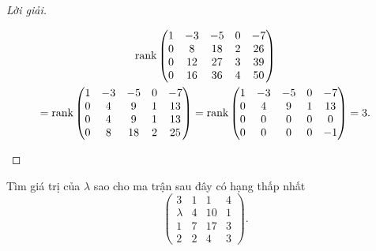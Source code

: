 \documentclass[class=nhvh-linear-algebra,crop=false]{standalone}
\begin{document}
\begin{proof}[Lời giải]
\begin{enumerate}[label = (\alph*)]
\begin{gather*}
                  \text{rank}\begin{pmatrix}
                      1 & -3 & -5 & 0 & -7 \\
                      0 & 8  & 18 & 2 & 26 \\
                      0 & 12 & 27 & 3 & 39 \\
                      0 & 16 & 36 & 4 & 50
                  \end{pmatrix} \\
                  =\text{rank}\begin{pmatrix}
                      1 & -3 & -5 & 0 & -7 \\
                      0 & 4  & 9  & 1 & 13 \\
                      0 & 4  & 9  & 1 & 13 \\
                      0 & 8  & 18 & 2 & 25
                  \end{pmatrix}
                  =\text{rank}\begin{pmatrix}
                      1 & -3 & -5 & 0 & -7 \\
                      0 & 4  & 9  & 1 & 13 \\
                      0 & 0  & 0  & 0 & 0  \\
                      0 & 0  & 0  & 0 & -1
                  \end{pmatrix}
                  = 3.
              \end{gather*}
              \endgroup{}
    \end{enumerate}
\end{proof}

\begin{exercise}
    \par Tìm giá trị của $\lambda$ sao cho ma trận sau đây có hạng thấp nhất
    \[
        \begin{pmatrix}
            3       & 1 & 1  & 4 \\
            \lambda & 4 & 10 & 1 \\
            1       & 7 & 17 & 3 \\
            2       & 2 & 4  & 3
        \end{pmatrix}.
    \]
\end{exercise}
\end{document}
